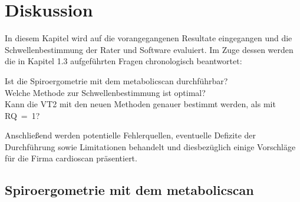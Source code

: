 \chapter{Diskussion}

In diesem Kapitel wird auf die vorangegangenen Resultate eingegangen und die Schwellenbestimmung der Rater und Software evaluiert. Im Zuge dessen werden die in Kapitel 1.3 aufgeführten Fragen chronologisch beantwortet:
%
\begin{tabbing}
	Ist die Spiroergometrie mit dem metabolicscan durchführbar?\\
	Welche Methode zur Schwellenbestimmung ist optimal?\\
	Kann die VT2 mit den neuen Methoden genauer bestimmt werden, als mit RQ~=~1?
\end{tabbing}
%
Anschließend werden potentielle Fehlerquellen, eventuelle Defizite der Durchführung sowie Limitationen behandelt und diesbezüglich einige Vorschläge für die Firma cardioscan präsentiert.
%

\section{Spiroergometrie mit dem metabolicscan}

